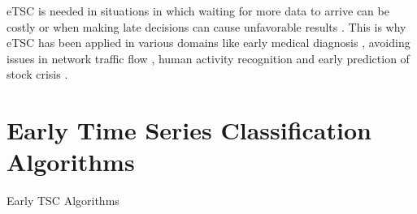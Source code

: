 eTSC is needed in situations in which waiting for more data to arrive can be costly or
when making late decisions can cause unfavorable results \cite{mori2017early,parrish2013classifying,lin2015reliable}.
This is why eTSC has been applied in various domains like early medical diagnosis \cite{griffin2001toward,ghalwash2012early},
avoiding issues in network traffic flow \cite{bernaille2006traffic}, human activity recognition \cite{yazdanbakhsh2019multivariate,gupta2020fault}
and early prediction of stock crisis \cite{ghalwash2014utilizing}.

\section{Early Time Series Classification Algorithms}
\label{SectionETSCA}
{Early TSC Algorithms}